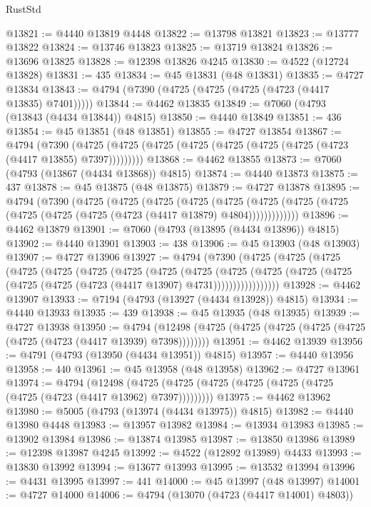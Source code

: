 \begin{lexlean}{RustStd}
\begin{coremodule}
@13821 := @4440 @13819 @4448
@13822 := @13798 @13821
@13823 := @13777 @13822
@13824 := @13746 @13823
@13825 := @13719 @13824
@13826 := @13696 @13825
@13828 := @12398 @13826 @4245
@13830 := @4522 (@12724 @13828)
@13831 := 435
@13834 := @45 @13831 (@48 @13831)
@13835 := @4727 @13834
@13843 := @4794 (@7390 (@4725 (@4725 (@4725 (@4723 (@4417 @13835) @7401)))))
@13844 := @4462 @13835
@13849 := @7060 (@4793 (@13843 (@4434 @13844)) @4815)
@13850 := @4440 @13849
@13851 := 436
@13854 := @45 @13851 (@48 @13851)
@13855 := @4727 @13854
@13867 := @4794
    (@7390 (@4725 (@4725 (@4725 (@4725 (@4725 (@4725 (@4725 (@4723 (@4417 @13855) @7397)))))))))
@13868 := @4462 @13855
@13873 := @7060 (@4793 (@13867 (@4434 @13868)) @4815)
@13874 := @4440 @13873
@13875 := 437
@13878 := @45 @13875 (@48 @13875)
@13879 := @4727 @13878
@13895 := @4794
    (@7390
      (@4725
        (@4725
          (@4725
            (@4725
              (@4725
                (@4725 (@4725 (@4725 (@4725 (@4725 (@4725 (@4723 (@4417 @13879) @4804)))))))))))))
@13896 := @4462 @13879
@13901 := @7060 (@4793 (@13895 (@4434 @13896)) @4815)
@13902 := @4440 @13901
@13903 := 438
@13906 := @45 @13903 (@48 @13903)
@13907 := @4727 @13906
@13927 := @4794
    (@7390
      (@4725
        (@4725
          (@4725
            (@4725
              (@4725
                (@4725
                  (@4725
                    (@4725
                      (@4725
                        (@4725
                          (@4725
                            (@4725 (@4725 (@4725 (@4725 (@4723 (@4417 @13907) @4731)))))))))))))))))
@13928 := @4462 @13907
@13933 := @7194 (@4793 (@13927 (@4434 @13928)) @4815)
@13934 := @4440 @13933
@13935 := 439
@13938 := @45 @13935 (@48 @13935)
@13939 := @4727 @13938
@13950 := @4794
    (@12498 (@4725 (@4725 (@4725 (@4725 (@4725 (@4725 (@4723 (@4417 @13939) @7398))))))))
@13951 := @4462 @13939
@13956 := @4791 (@4793 (@13950 (@4434 @13951)) @4815)
@13957 := @4440 @13956
@13958 := 440
@13961 := @45 @13958 (@48 @13958)
@13962 := @4727 @13961
@13974 := @4794
    (@12498 (@4725 (@4725 (@4725 (@4725 (@4725 (@4725 (@4725 (@4723 (@4417 @13962) @7397)))))))))
@13975 := @4462 @13962
@13980 := @5005 (@4793 (@13974 (@4434 @13975)) @4815)
@13982 := @4440 @13980 @4448
@13983 := @13957 @13982
@13984 := @13934 @13983
@13985 := @13902 @13984
@13986 := @13874 @13985
@13987 := @13850 @13986
@13989 := @12398 @13987 @4245
@13992 := @4522 (@12892 @13989) @4433
@13993 := @13830 @13992
@13994 := @13677 @13993
@13995 := @13532 @13994
@13996 := @4431 @13995
@13997 := 441
@14000 := @45 @13997 (@48 @13997)
@14001 := @4727 @14000
@14006 := @4794 (@13070 (@4723 (@4417 @14001) @4803))

\end{coremodule}
\end{lexlean}
